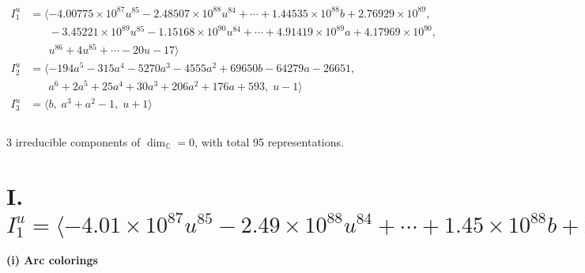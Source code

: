 \documentclass[1p]{elsarticle_modified}
\theoremstyle{definition}
\begin{document}
\begin{align*}
I^u_{1}&=\langle 
-4.00775\times10^{87} u^{85}-2.48507\times10^{88} u^{84}+\cdots+1.44535\times10^{88} b+2.76929\times10^{89},\\
\phantom{I^u_{1}}&\phantom{= \langle  }-3.45221\times10^{89} u^{85}-1.15168\times10^{90} u^{84}+\cdots+4.91419\times10^{89} a+4.17969\times10^{90},\\
\phantom{I^u_{1}}&\phantom{= \langle  }u^{86}+4 u^{85}+\cdots-20 u-17\rangle \\
I^u_{2}&=\langle 
-194 a^5-315 a^4-5270 a^3-4555 a^2+69650 b-64279 a-26651,\\
\phantom{I^u_{2}}&\phantom{= \langle  }a^6+2 a^5+25 a^4+30 a^3+206 a^2+176 a+593,\;u-1\rangle \\
I^u_{3}&=\langle 
b,\;a^3+a^2-1,\;u+1\rangle \\
\\
\end{align*}
\raggedright * 3 irreducible components of $\dim_{\mathbb{C}}=0$, with total 95 representations.\\
\newpage
\renewcommand{\arraystretch}{1}
\centering \section*{I. $I^u_{1}= \langle -4.01\times10^{87} u^{85}-2.49\times10^{88} u^{84}+\cdots+1.45\times10^{88} b+2.77\times10^{89},\;-3.45\times10^{89} u^{85}-1.15\times10^{90} u^{84}+\cdots+4.91\times10^{89} a+4.18\times10^{90},\;u^{86}+4 u^{85}+\cdots-20 u-17 \rangle$}
\flushleft \textbf{(i) Arc colorings}\\
\end{document}
